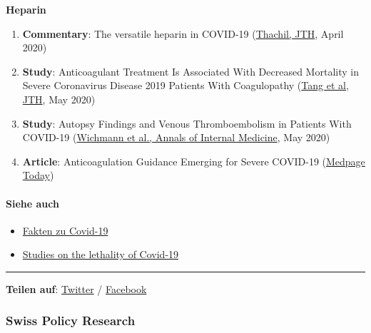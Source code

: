 \textbf{Heparin}

\begin{enumerate}
\def\labelenumi{\arabic{enumi}.}
\tightlist
\item
  \textbf{Commentary}: The versatile heparin in COVID‐19
  (\href{https://onlinelibrary.wiley.com/doi/10.1111/jth.14821}{Thachil,
  JTH}, April 2020)
\item
  \textbf{Study}: Anticoagulant Treatment Is Associated With Decreased
  Mortality in Severe Coronavirus Disease 2019 Patients With
  Coagulopathy (\href{https://pubmed.ncbi.nlm.nih.gov/32220112/}{Tang et
  al, JTH}, May 2020)
\item
  \textbf{Study}: Autopsy Findings and Venous Thromboembolism in
  Patients With COVID-19
  (\href{https://www.acpjournals.org/doi/10.7326/M20-2003}{Wichmann et
  al., Annals of Internal Medicine}, May 2020)
\item
  \textbf{Article}: Anticoagulation Guidance Emerging for Severe
  COVID-19
  (\href{https://www.medpagetoday.com/infectiousdisease/covid19/85865}{Medpage
  Today})
\end{enumerate}

\hypertarget{siehe-auch}{%
\paragraph{Siehe auch}\label{siehe-auch}}

\begin{itemize}
\tightlist
\item
  \href{https://swprs.org/covid-19-hinweis-ii/}{Fakten zu Covid-19}
\item
  \href{https://swprs.org/studies-on-covid-19-lethality/}{Studies on the
  lethality of Covid-19}
\end{itemize}

\begin{center}\rule{0.5\linewidth}{\linethickness}\end{center}

\textbf{Teilen auf}:
\href{https://twitter.com/intent/tweet?url=https://swprs.org/zur-behandlung-von-covid-19/}{Twitter}
/
\href{https://www.facebook.com/share.php?u=https://swprs.org/zur-behandlung-von-covid-19/}{Facebook}

\hypertarget{swiss-policy-research}{%
\subsubsection{Swiss Policy Research}\label{swiss-policy-research}}

